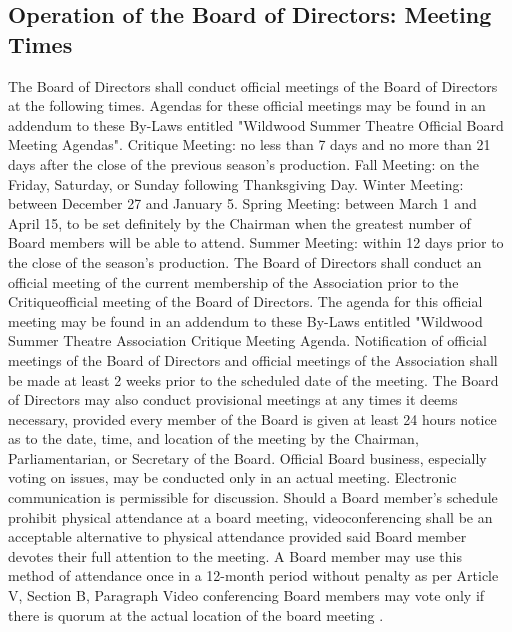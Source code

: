 \documentclass{wst}
\begin{document}
\begin{outline}[enumerate]
\section{Operation of the Board of Directors: Meeting Times}
\1 The Board of Directors shall conduct official meetings of the Board of Directors at the following times.  Agendas for these official meetings may be found in an addendum to these By-Laws entitled "Wildwood Summer Theatre Official Board Meeting Agendas".
\2 Critique Meeting: no less than 7 days and no more than 21 days after the close of the previous season's production.
\2 Fall Meeting: on the Friday, Saturday, or Sunday following Thanksgiving Day.
\2 Winter Meeting: between December 27 and January 5.
\2 Spring Meeting: between March 1 and April 15, to be set definitely by the Chairman when the greatest number of Board members will be able to attend.
\2 Summer Meeting: within 12 days prior to the close of the season's production.
\1 The Board of Directors shall conduct an official meeting of the current membership of the Association prior to the Critiqueofficial meeting of the Board of Directors.  The agenda for this official meeting may be found in an addendum to these By-Laws entitled "Wildwood Summer Theatre Association Critique Meeting Agenda.
\1 Notification of official meetings of the Board of Directors and official meetings of the Association shall be made at least 2 weeks prior to the scheduled date of the meeting.
\1 The Board of Directors may also conduct provisional meetings at any times it deems necessary, provided every member of the Board is given at least 24 hours notice as to the date, time, and location of the meeting by the Chairman, Parliamentarian, or Secretary of the Board.
\1 Official Board business, especially voting on issues, may be conducted only in an actual meeting.  Electronic communication is permissible for discussion.
\2 Should a Board member’s  schedule prohibit physical attendance at a board meeting, videoconferencing shall be an acceptable alternative to physical attendance provided said Board member devotes their full attention to the meeting. A Board member may use this method of attendance once in a 12-month period without penalty as per Article V, Section B, Paragraph
\3 Video conferencing Board members may vote only if there is quorum at the actual location of the board meeting .  
\end{outline}
\end{document}
